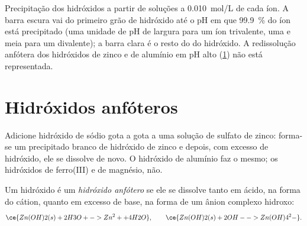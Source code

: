 \begin{omfigure}

{\small Precipitação dos hidróxidos a partir de soluções a
\qty{0.010}{mol/L} de cada íon. A barra escura vai do primeiro grão de
hidróxido até o pH em que \qty{99.9}{\percent} do íon está precipitado
(uma unidade de pH de largura para um íon trivalente, uma e meia para um
divalente); a barra clara é o resto do  do
hidróxido. A redissolução anfótera dos hidróxidos de zinco e de alumínio
em pH alto (\cref{sec:b1:precipitation:amphoteric}) não está
representada.}
\end{omfigure}

\section{Hidróxidos anfóteros}\label{sec:b1:precipitation:amphoteric}

Adicione hidróxido de sódio gota a gota a uma solução de sulfato de
zinco: forma-se um precipitado branco de hidróxido de zinco e depois,
com excesso de hidróxido, ele se dissolve de novo. O hidróxido de
alumínio faz o mesmo; os hidróxidos de ferro(III) e de magnésio, não.

\begin{definition}\label{def:b1:precipitation:amphoteric-hydroxide}
Um hidróxido é um \emph{hidróxido anfótero}
se ele se dissolve tanto em ácido, na forma do cátion, quanto em excesso
de base, na forma de um ânion complexo hidroxo:
\[
  \ce{Zn(OH)2(s) + 2H3O+ -> Zn^2+ + 4H2O}, \qquad
  \ce{Zn(OH)2(s) + 2OH- -> Zn(OH)4^2-} .
\]
\end{definition}

